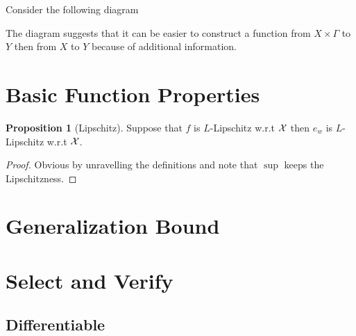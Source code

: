 \documentclass[11pt, oneside]{article}   	%
\theoremstyle{definition}
\newtheorem*{prop}{Proposition}
\begin{document}
Consider the following diagram
\begin{center}
\end{center}

The diagram suggests that it can be easier to construct a function from $X\times \Gamma$ to $Y$ then from $X$ to $Y$ because of additional information.

\section{Basic Function Properties}

\begin{prop}
	[Lipschitz] Suppose that $f$ is $L$-Lipschitz w.r.t $\mathcal{X}$ then $e_w$ is $L$-Lipschitz w.r.t $\mathcal{X}$.
\end{prop}

\begin{proof}
	Obvious by unravelling the definitions and note that $\sup$ keeps the Lipschitzness.
\end{proof}



\section{Generalization Bound}


\section{Select and Verify}

\subsection{Differentiable}
\end{document}

